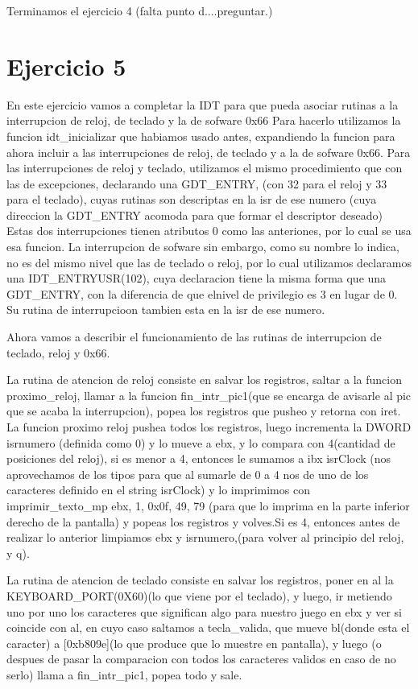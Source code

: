 \documentclass[a4paper]{article}
\begin{document}
  
Terminamos el ejercicio 4 (falta punto d....preguntar.)

\newpage
\section{Ejercicio 5}

	En este ejercicio vamos a completar la IDT para que pueda asociar rutinas a la interrupcion de reloj, de teclado y la de sofware 0x66
Para hacerlo utilizamos la funcion idt_inicializar que habiamos usado antes, expandiendo la funcion para ahora incluir a las interrupciones de reloj, de teclado y a la de sofware 0x66.
	Para las interrupciones de reloj y teclado, utilizamos el mismo procedimiento que con las de excepciones, declarando una GDT_ENTRY, (con 32 para el reloj y 33 para el teclado), cuyas rutinas son descriptas en la isr de ese numero (cuya direccion la GDT_ENTRY acomoda para que formar el descriptor deseado) Estas dos interrupciones tienen atributos 0 como las anteriones, por lo cual se usa esa funcion.
	La interrupcion de sofware sin embargo, como su nombre lo indica, no es del mismo nivel que las de teclado o reloj,  por lo cual utilizamos declaramos una   
IDT_ENTRYUSR(102), cuya declaracion tiene la misma forma que una GDT_ENTRY, con la diferencia de que elnivel de privilegio es 3 en lugar de 0. Su rutina de interrupcioon tambien esta en la isr de ese numero.

	Ahora vamos a describir el funcionamiento de las rutinas de interrupcion de teclado, reloj y 0x66. 

	La rutina de atencion de reloj consiste en salvar los registros,  saltar a  
la funcion proximo_reloj, llamar a la funcion fin_intr_pic1(que se encarga de avisarle al pic que se acaba la interrupcion), popea los registros que pusheo y retorna con iret.  La funcion proximo reloj pushea todos los registros, luego incrementa la DWORD isrnumero (definida como 0) y lo mueve a ebx, y lo compara con 4(cantidad de posiciones del reloj), si es menor a 4, entonces le sumamos a ibx isrClock (nos aprovechamos de los tipos para que al sumarle de 0 a 4 nos de uno de los caracteres definido en el string isrClock) y lo imprimimos con imprimir_texto_mp ebx, 1, 0x0f, 49, 79 (para que lo imprima en la parte inferior derecho de la pantalla) y popeas los registros y volves.Si es 4, entonces antes de realizar lo anterior limpiamos ebx y isrnumero,(para volver al principio del reloj, y q).	
	
	
	La rutina de atencion de teclado consiste en salvar los registros, poner en al la KEYBOARD_PORT(0X60)(lo que viene por el teclado), y luego, ir metiendo uno por uno los caracteres que significan algo para nuestro juego en ebx y ver si coincide con al, en cuyo caso saltamos a tecla_valida, que mueve bl(donde esta el caracter) a [0xb809e](lo que produce que lo muestre en pantalla), y luego (o despues de pasar la comparacion con todos los caracteres validos en caso de no serlo) llama a fin_intr_pic1, popea todo y sale. 
	
\end{document}
